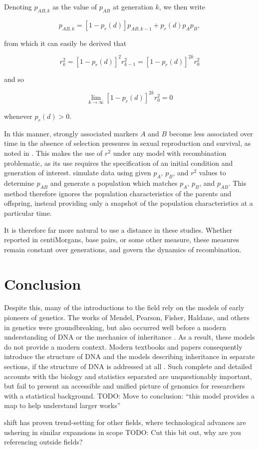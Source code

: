 \documentclass{article}
\newcommand{\TODO}[1]{{\color{brickred} TODO:  {#1}}}
\begin{document}
Denoting $p_{AB,k}$ as the value of $p_{AB}$ at generation $k$, we then write

$$p_{AB,k} = [1 - p_r(d)] p_{AB,k-1} + p_r(d) p_A p_B,$$

\noindent from which it can easily be derived that

$$r^2_k = \left [ 1 - p_r(d) \right ]^2 r^2_{k-1} =  \left [ 1 - p_r(d) \right ]^{2k} r^2_0$$

\noindent and so

$$\lim_{k \rightarrow \infty} \left [ 1 - p_r(d) \right ]^{2k} r^2_0 = 0$$

\noindent whenever $p_r(d) > 0$.

In this manner, strongly associated markers $A$ and $B$ become less associated over time in the absence of selection pressures in sexual reproduction and survival, as noted in \cite{siegmundyakir2007}. This makes the use of $r^2$ under any model with recombination problematic, as its use requires the specification of an initial condition and generation of interest. \cite{LiJi2005} simulate data using given $p_A$, $p_B$, and $r^2$ values to determine $p_{AB}$ and generate a population which matches $p_A$, $p_B$, and $p_{AB}$. This method therefore ignores the population characteristics of the parents and offspring, instead providing only a snapshot of the population characteristics at a particular time.

It is therefore far more natural to use a distance in these studies. Whether reported in centiMorgans, base pairs, or some other measure, these measures remain constant over generations, and govern the dynamics of recombination.

\section{Conclusion} \label{sec:conclusion}

Despite this, many of the introductions to the field rely on the models of early pioneers of genetics. The works of Mendel, Pearson, Fisher, Haldane, and others in genetics were groundbreaking, but also occurred well before a modern understanding of DNA or the mechanics of inheritance \cite{visschergoddard2019}. As a result, these models do not provide a modern context. Modern textbooks and papers consequently introduce the structure of DNA and the models describing inheritance in separate sections, if the structure of DNA is addressed at all \cite{crowkimura1970intro, siegmundyakir2007, xu2013principles, liu2017statistical}. Such complete and detailed accounts with the biology and statistics separated are unquestionably important, but fail to present an accessible and unified picture of genomics for researchers with a statistical background. \TODO{Move to conclusion: ``this model provides a map to help understand larger works''}

 shift has proven trend-setting for other fields, where technological advances are ushering in similar expansions in scope \cite{hasinetal2017multi} \TODO{Cut this bit out, why are you referencing outside fields?}


\renewcommand*{\bibname}{References} %

\end{document}
